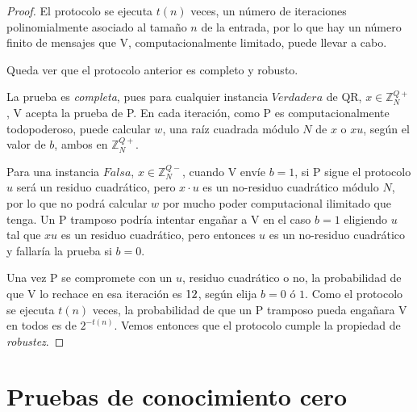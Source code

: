 \begin{proof}
	
	El protocolo se ejecuta $t(n)$ veces, un número de iteraciones polinomialmente asociado al tamaño $n$ de la entrada, por lo que hay un número finito de mensajes que V, computacionalmente limitado, puede llevar a cabo. 
	
	\hfil 
	
	Queda ver que el protocolo anterior es completo y robusto.
	
	La prueba es \textit{completa}, pues para cualquier instancia $Verdadera$ de QR, $x \in \mathbb{Z}^{Q+}_N$, V acepta la prueba de P. En cada iteración, como P es computacionalmente todopoderoso, puede calcular $w$, una raíz cuadrada módulo $N$ de $x$ o $xu$, según el valor de $b$, ambos en $\mathbb{Z}^{Q+}_N$.
	
	Para una instancia $Falsa$, $x \in \mathbb{Z}^{Q-}_N$, cuando V envíe $b=1$, si P sigue el protocolo $u$ será un residuo cuadrático, pero $x\cdot u$ es un no-residuo cuadrático módulo $N$, por lo que no podrá calcular $w$ por mucho poder computacional ilimitado que tenga. Un P tramposo podría intentar engañar a V en el caso $b = 1$ eligiendo $u$ tal que $xu$ es un residuo cuadrático, pero entonces $u$ es un no-residuo cuadrático y fallaría la prueba si $b=0$.
	
	Una vez P se compromete con un $u$, residuo cuadrático o no, la probabilidad de que V lo rechace en esa iteración es $1\/2$, según elija $b=0$ ó $1$. Como el protocolo se ejecuta $t(n)$ veces, la probabilidad de que un P tramposo pueda engañara V en todos es de $2^{-t(n)}$. Vemos entonces que el protocolo cumple la propiedad de \textit{robustez}.
\end{proof}




\section{Pruebas de conocimiento cero}

